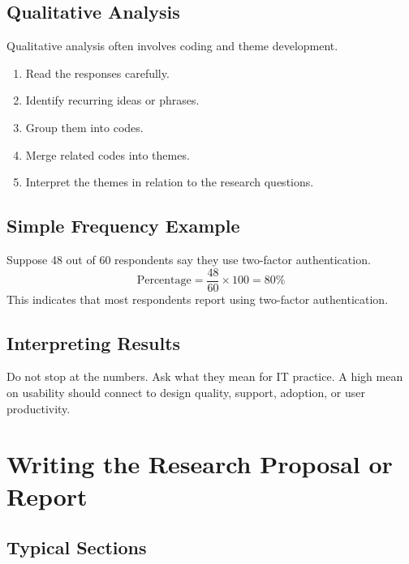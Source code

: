 \documentclass[11pt,a4paper]{article}
\begin{document}
\subsection{Qualitative Analysis}

Qualitative analysis often involves coding and theme development.

\begin{enumerate}[leftmargin=*]
  \item Read the responses carefully.
  \item Identify recurring ideas or phrases.
  \item Group them into codes.
  \item Merge related codes into themes.
  \item Interpret the themes in relation to the research questions.
\end{enumerate}

\subsection{Simple Frequency Example}

\begin{examplebox}
Suppose 48 out of 60 respondents say they use two-factor authentication.
\[
\text{Percentage} = \frac{48}{60} \times 100 = 80\%
\]
This indicates that most respondents report using two-factor authentication.
\end{examplebox}

\subsection{Interpreting Results}

\begin{conceptbox}
Do not stop at the numbers. Ask what they mean for IT practice. A high mean on usability should connect to design quality, support, adoption, or user productivity.
\end{conceptbox}

\section{Writing the Research Proposal or Report}

\subsection{Typical Sections}
\end{document}
